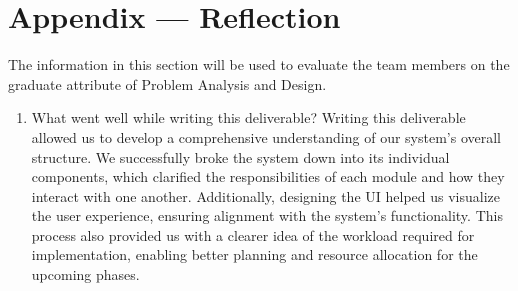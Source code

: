 \documentclass[12pt, titlepage]{article}
\begin{document}

\newpage{}

\section*{Appendix --- Reflection}


The information in this section will be used to evaluate the team members on the
graduate attribute of Problem Analysis and Design.



\begin{enumerate}
  \item What went well while writing this deliverable?
  Writing this deliverable allowed us to develop a comprehensive understanding of our system's overall structure. We successfully broke the system down into its individual components, which clarified the responsibilities of each module and how they interact with one another. Additionally, designing the UI helped us visualize the user experience, ensuring alignment with the system's functionality. This process also provided us with a clearer idea of the workload required for implementation, enabling better planning and resource allocation for the upcoming phases.


\end{enumerate}
\end{document}
